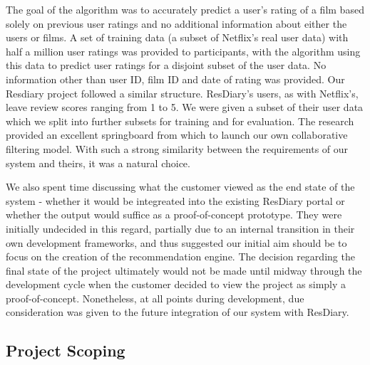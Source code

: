 \documentclass{l3proj}
\begin{document}
The goal of the algorithm was to accurately predict a user's rating of a film based solely on previous user ratings and no additional information about either the users or films. A set of training data (a subset of Netflix's real user data) with half a million user ratings was provided to participants, with the algorithm using this data to predict user ratings for a disjoint subset of the user data. No information other than user ID, film ID and date of rating was provided. Our Resdiary project followed a similar structure. ResDiary's users, as with Netflix's, leave review scores ranging from 1 to 5. We were given a subset of their user data which we split into further subsets for training and for evaluation. The research provided an excellent springboard from which to launch our own collaborative filtering model. With such a strong similarity between the requirements of our system and theirs, it was a natural choice.


We also spent time discussing what the customer viewed as the end state of the system - whether it would be integreated into the existing ResDiary portal or whether the output would suffice as a proof-of-concept prototype. They were initially undecided in this regard, partially due to an internal transition in their own development frameworks, and thus suggested our initial aim should be to focus on the creation of the recommendation engine. The decision regarding the final state of the project ultimately would not be made until midway through the development cycle when the customer decided to view the project as simply a proof-of-concept. Nonetheless, at all points during development, due consideration was given to the future integration of our system with ResDiary. 


\subsection{Project Scoping}
\label{sec:ourinitobjectives}
\end{document}
